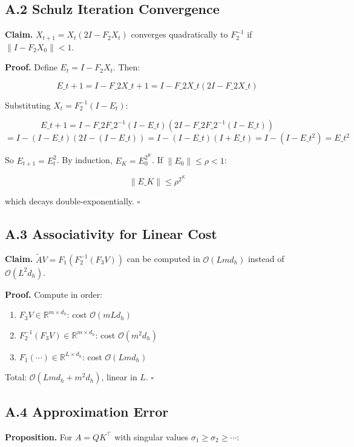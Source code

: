 \subsection{A.2 Schulz Iteration Convergence}

\textbf{Claim.} $X_{t+1} = X_t (2I - F_2 X_t)$ converges quadratically to $F_2^{-1}$ 
if $\|I - F_2 X_0\| < 1$.

\textbf{Proof.} Define $E_t = I - F_2 X_t$. Then:

\[
E\_{t+1} = I - F\_2 X\_{t+1} = I - F\_2 X\_t (2I - F\_2 X\_t)
\]

Substituting $X_t = F_2^{-1}(I - E_t)$:

\[
E\_{t+1} = I - F\_2 F\_2^{-1}(I - E\_t) (2I - F\_2 F\_2^{-1}(I - E\_t))
\]
\[
= I - (I - E\_t)(2I - (I - E\_t)) = I - (I - E\_t)(I + E\_t) = I - (I - E\_t^2) = E\_t^2
\]

So $E_{t+1} = E_t^2$. By induction, $E_K = E_0^{2^K}$. If $\|E_0\| \le \rho < 1$:

\[
\|E\_K\| \le \rho^{2^K}
\]

which decays double-exponentially. $\square$

\subsection{A.3 Associativity for Linear Cost}

\textbf{Claim.} $\tilde{A} V = F_1 (F_2^{-1} (F_3 V))$ can be computed in 
$\mathcal{O}(L m d_h)$ instead of $\mathcal{O}(L^2 d_h)$.

\textbf{Proof.} Compute in order:

\begin{enumerate}
\item $F_3 V \in \mathbb{R}^{m \times d_h}$: cost $\mathcal{O}(m L d_h)$
\item $F_2^{-1} (F_3 V) \in \mathbb{R}^{m \times d_h}$: cost $\mathcal{O}(m^2 d_h)$
\item $F_1 (\cdots) \in \mathbb{R}^{L \times d_h}$: cost $\mathcal{O}(L m d_h)$

\end{enumerate}
Total: $\mathcal{O}(L m d_h + m^2 d_h)$, linear in $L$. $\square$

\subsection{A.4 Approximation Error}

\textbf{Proposition.} For $A = QK^\top$ with singular values $\sigma_1 \ge \sigma_2 \ge \cdots$:

